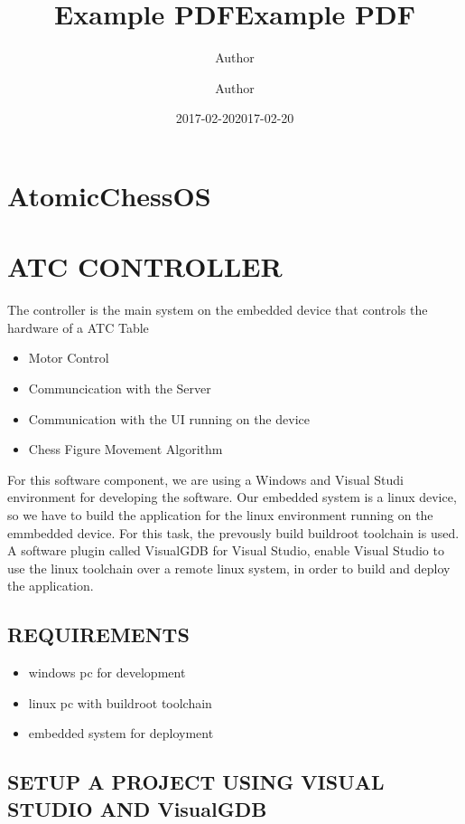 \documentclass[
  english,
  paper=a4,
  ,captions=tableheading
]{scrartcl}
\title{Example PDF}
\author{Author}
\date{2017-02-20}
\title{Example PDF}
\author{Author}
\date{2017-02-20}
\providecommand{\tightlist}{%
  \setlength{\itemsep}{0pt}\setlength{\parskip}{0pt}}
\begin{document}




\hypertarget{atomicchessos}{%
\section{AtomicChessOS}\label{atomicchessos}}

\hypertarget{atc-controller}{%
\section{ATC CONTROLLER}\label{atc-controller}}

The controller is the main system on the embedded device that controls
the hardware of a ATC Table

\begin{itemize}
\tightlist
\item
  Motor Control
\item
  Communcication with the Server
\item
  Communication with the UI running on the device
\item
  Chess Figure Movement Algorithm
\end{itemize}

For this software component, we are using a Windows and Visual Studi
environment for developing the software. Our embedded system is a linux
device, so we have to build the application for the linux environment
running on the emmbedded device. For this task, the prevously build
buildroot toolchain is used. A software plugin called VisualGDB for
Visual Studio, enable Visual Studio to use the linux toolchain over a
remote linux system, in order to build and deploy the application.

\hypertarget{requirements}{%
\subsection{REQUIREMENTS}\label{requirements}}

\begin{itemize}
\tightlist
\item
  windows pc for development
\item
  linux pc with buildroot toolchain
\item
  embedded system for deployment
\end{itemize}

\hypertarget{setup-a-project-using-visual-studio-and-visualgdb}{%
\subsection{SETUP A PROJECT USING VISUAL STUDIO AND
VisualGDB}\label{setup-a-project-using-visual-studio-and-visualgdb}}
\end{document}
